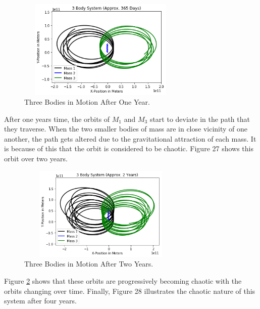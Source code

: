 \documentclass[twocolumn]{article}
\begin{document}
\begin{figure}[h]
    \centering
    \includegraphics[width=8cm, height=4.75cm]{Figures/3-Body Dynamics (13).png}
    \caption{\small{Three Bodies in Motion After One Year.}}
    \label{Fig. 3-Body Dynamics Fig. 13}
\end{figure}
\par \noindent
After one years time, the orbits of $M_1$ and $M_3$ start to deviate in the path that they traverse. When the two smaller bodies of mass are in close vicinity of one another, the path gets altered due to the gravitational attraction of each mass. It is because of this that the orbit is considered to be chaotic. Figure 27 shows this orbit over two years.
\begin{figure}[h]
    \centering
    \includegraphics[width=8cm, height=4.5cm]{Figures/3-Body Dynamics (14).png}
    \caption{\small{Three Bodies in Motion After Two Years.}}
    \label{Fig. 3-Body Dynamics Fig. 14}
\end{figure}
\newpage \noindent
Figure \ref{Fig. 3-Body Dynamics Fig. 14} shows that these orbits are progressively becoming chaotic with the orbits changing over time. Finally, Figure 28 illustrates the chaotic nature of this system after four years.
\end{document}
